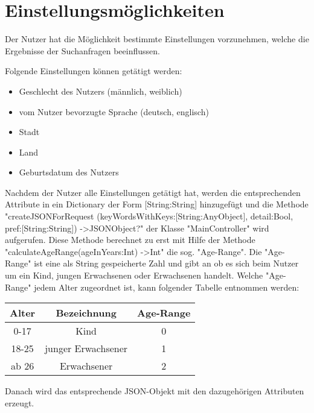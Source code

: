 \documentclass[a4paper,10pt]{scrreprt}
\begin{document}
\chapter{Einstellungsmöglichkeiten}

Der Nutzer hat die Möglichkeit bestimmte Einstellungen vorzunehmen, welche die Ergebnisse der Suchanfragen beeinflussen.   

Folgende Einstellungen können getätigt werden:

\begin{itemize}
	\item Geschlecht des Nutzers (männlich, weiblich)
	\item vom Nutzer bevorzugte Sprache (deutsch, englisch)
	\item Stadt
	\item Land
	\item Geburtsdatum des Nutzers
\end{itemize}


Nachdem der Nutzer alle Einstellungen getätigt hat, werden die entsprechenden Attribute in
ein Dictionary der Form [String:String] hinzugefügt und die Methode "createJSONForRequest
(keyWordsWithKeys:[String:AnyObject],
detail:Bool, pref:[String:String]) -\textgreater JSONObject?" der Klasse "MainController" wird aufgerufen. Diese Methode berechnet zu erst mit Hilfe der Methode "calculateAgeRange(ageInYears:Int) -\textgreater Int" die sog. "Age-Range". Die "Age-Range" ist eine als String gespeicherte Zahl und gibt an ob es sich beim Nutzer um ein Kind, jungen Erwachsenen oder Erwachsenen handelt. Welche "Age-Range" jedem Alter zugeordnet ist, kann folgender Tabelle entnommen werden:

\begin{tabular}{c|c|c}
Alter & Bezeichnung & Age-Range \\
\hline
0-17 & Kind & 0 \\
18-25 & junger Erwachsener & 1 \\
ab 26 & Erwachsener & 2
\end{tabular}

Danach wird das entsprechende JSON-Objekt mit den dazugehörigen Attributen erzeugt.
\end{document}
